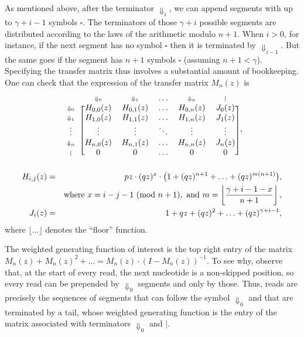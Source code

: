 \documentclass{article}
\newcommand{\Dn}[1]{\scriptstyle{\Downarrow_{#1}}}
\newcommand{\nd}{\scriptstyle{|}}
\newcommand{\modulo}[1]{\ (\mathrm{mod}\ #1)}
\begin{document}
As mentioned above, after the terminator $\Downarrow_i$, we can append
segments with up to $\gamma+i-1$ symbols $\square$. The terminators of
those $\gamma+i$ possible segments are distributed according to the laws
of the arithmetic modulo $n+1$. When $i > 0$, for instance, if the next
segment has no symbol $\square$ then it is terminated by
$\Downarrow_{i-1}$. But the same goes if the segment has $n+1$ symbols
$\square$ (assuming $n+1 < \gamma$). Specifying the transfer matrix thus
involves a substantial amount of bookkeeping. One can check that the
expression of the transfer matrix $M_n(z)$ is
\begin{equation*}
\begin{blockarray}{cccccc}
   & \Dn{0} & \Dn{1} & \ldots & \Dn{n} & \nd \\
\begin{block}{c[ccccc]}
\Dn{0} & H_{0,0}(z) & H_{0,1}(z) & \ldots & H_{0,n}(z) & J_0(z) \\
\Dn{1} & H_{1,0}(z) & H_{1,1}(z) & \ldots & H_{1,n}(z) & J_1(z) \\
\vdots & \vdots & \vdots & \ddots & \vdots & \vdots \\
\Dn{n} & H_{n,0}(z) & H_{n,1}(z) & \ldots & H_{n,n}(z) & J_n(z) \\
\nd & 0 & 0 & \ldots & 0 & 0 \\
\end{block}
\end{blockarray},
\end{equation*}
\begin{eqnarray}
H_{i,j}(z) &=& pz \cdot (qz)^x \cdot \big( 1 + (qz)^{n+1} +
  \ldots + (qz)^{m(n+1)} \big), \\
\notag
  &\;& \text{where } x = i-j-1 \modulo{n+1},
  \text{ and } m = \left\lfloor
  \frac{\gamma+i-1-x}{n+1} \right\rfloor, \\
J_i(z) &=& 1 + qz + (qz)^2 + \ldots + (qz)^{\gamma+i-1},
\end{eqnarray}
where $\lfloor \ldots \rfloor$ denotes the ``floor'' function.

The weighted generating function of interest is the top right entry of the
matrix $M_n(z) + M_n(z)^2 + \ldots = M_n(z)\cdot(I-M_n(z))^{-1}$. To see
why, observe that, at the start of every read, the next nucleotide is a
non-skipped position, so every read can be prepended by $\Downarrow_0$
segments and only by those. Thus, reads are precisely the sequences of
segments that can follow the symbol $\Downarrow_0$ and that are terminated
by a tail, whose weighted generating function is the entry of the matrix
associated with terminators $\Downarrow_0$ and $|$.
\end{document}
